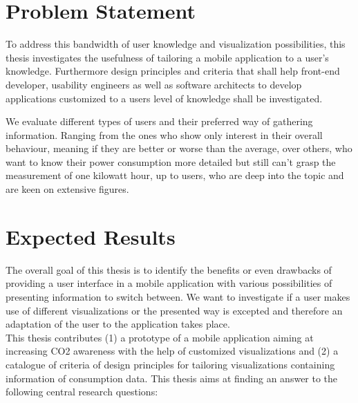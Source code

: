 \documentclass[12pt,a4paper,titlepage,oneside]{article}
\begin{document}
\section{Problem Statement}

To address this bandwidth of user knowledge and visualization possibilities, this thesis investigates the usefulness of tailoring a mobile application to a user's knowledge. Furthermore design principles and criteria that shall help front-end developer, usability engineers as well as software architects to develop applications customized to a users level of knowledge shall be investigated.

We evaluate different types of users and their preferred way of gathering information. Ranging from the ones who show only interest in their overall behaviour, meaning if they are better or worse than the average, over others, who want to know their power consumption more detailed but still can't grasp the measurement of one kilowatt hour, up to users, who are deep into the topic and are keen on extensive figures.

\section{Expected Results}

The overall goal of this thesis is to identify the benefits or even drawbacks of providing a user interface in a mobile application with various possibilities of presenting information to switch between. We want to investigate if a user makes use of different visualizations or the presented way is excepted and therefore an adaptation of the user to the application takes place.\\
This thesis contributes 
(1) a prototype of a mobile application aiming at increasing CO2 awareness with the help of customized visualizations and
(2) a catalogue of criteria of design principles for tailoring visualizations containing information of consumption data.
This thesis aims at finding an answer to the following central research questions:
\end{document}
